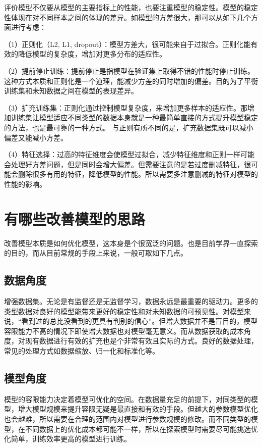评价模型不仅要从模型的主要指标上的性能，也要注重模型的稳定性。模型的稳定性体现在对不同样本之间的体现的差异。如模型的方差很大，那可以从如下几个方面进行考虑：

（1）正则化（L2, L1,
dropout）：模型方差大，很可能来自于过拟合。正则化能有效的降低模型的复杂度，增加对更多分布的适应性。

（2）提前停止训练：提前停止是指模型在验证集上取得不错的性能时停止训练。这种方式本质和正则化是一个道理，能减少方差的同时增加的偏差。目的为了平衡训练集和未知数据之间在模型的表现差异。

（3）扩充训练集：正则化通过控制模型复杂度，来增加更多样本的适应性。那增加训练集让模型适应不同类型的数据本身就是一种最简单直接的方式提升模型稳定的方法，也是最可靠的一种方式。
与正则有所不同的是，扩充数据集既可以减小偏差又能减小方差。

（4）特征选择：过高的特征维度会使模型过拟合，减少特征维度和正则一样可能会处理好方差问题，但是同时会增大偏差。但需要注意的是若过度删减特征，很可能会删除很多有用的特征，降低模型的性能。所以需要多注意删减的特征对模型的性能的影响。

\section{有哪些改善模型的思路}\label{ux6709ux54eaux4e9bux6539ux5584ux6a21ux578bux7684ux601dux8def}

改善模型本质是如何优化模型，这本身是个很宽泛的问题。也是目前学界一直探索的目的，而从目前常规的手段上来说，一般可取如下几点。

\subsection{数据角度}\label{ux6570ux636eux89d2ux5ea6}

增强数据集。无论是有监督还是无监督学习，数据永远是最重要的驱动力。更多的类型数据对良好的模型能带来更好的稳定性和对未知数据的可预见性。对模型来说，``看到过的总比没看到的更具有判别的信心''。但增大数据并不是盲目的，模型容限能力不高的情况下即使增大数据也对模型毫无意义。而从数据获取的成本角度，对现有数据进行有效的扩充也是个非常有效且实际的方式。良好的数据处理，常见的处理方式如数据缩放、归一化和标准化等。

\subsection{ 模型角度}\label{ux6a21ux578bux89d2ux5ea6}

模型的容限能力决定着模型可优化的空间。在数据量充足的前提下，对同类型的模型，增大模型规模来提升容限无疑是最直接和有效的手段。但越大的参数模型优化也会越难，所以需要在合理的范围内对模型进行参数规模的修改。而不同类型的模型，在不同数据上的优化成本都可能不一样，所以在探索模型时需要尽可能挑选优化简单，训练效率更高的模型进行训练。

